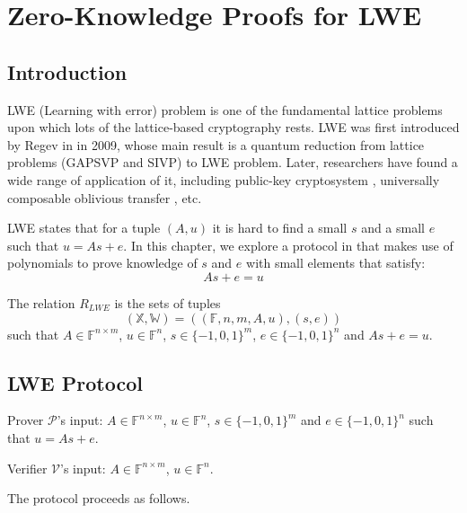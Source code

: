 \chapter{Zero-Knowledge Proofs for LWE}

\section{Introduction}

LWE (Learning with error) problem is one of the fundamental lattice problems upon which lots of the lattice-based cryptography rests. LWE was first introduced by Regev in \cite{DBLP:journals/jacm/Regev09} in 2009, whose main result is a quantum reduction from lattice problems (GAPSVP and SIVP) to LWE problem. Later, researchers have found a wide range of application of it, including public-key cryptosystem \cite{DBLP:journals/jacm/LyubashevskyPR13}, universally composable oblivious transfer \cite{DBLP:conf/crypto/PeikertVW08}, etc.

LWE states that for a tuple $(A, u)$ it is hard to find a small $s$ and a small $e$ such that $u = As+e$. In this chapter, we explore a protocol in \cite{lwe} that makes use of polynomials to prove knowledge of $s$ and $e$ with small elements that satisfy:
$$
    As + e = u
$$

\begin{definition}
The relation $R_{LWE}$ is the sets of tuples
$$
    (\mathbb{X}, \mathbb{W}) = ((\mathbb{F}, n, m, A, u), (s, e))
$$ 
such that $A \in \mathbb{F}^{n \times m}$, $u \in \mathbb{F}^{n}$, $s \in \{-1, 0, 1\}^{m}$, $e \in \{-1, 0, 1\}^{n}$ and $As + e = u$.
\end{definition}


\section{LWE Protocol}


Prover $\mathcal{P}$'s input: $A \in \mathbb{F}^{n \times m}$, $u \in \mathbb{F}^{n}$, $s \in \{-1, 0, 1\}^{m}$ and $e \in \{-1, 0, 1\}^{n}$ such that $u = As + e$.

Verifier $\mathcal{V}$'s input: $A \in \mathbb{F}^{n \times m}$, $u \in \mathbb{F}^{n}$.

The protocol proceeds as follows.



